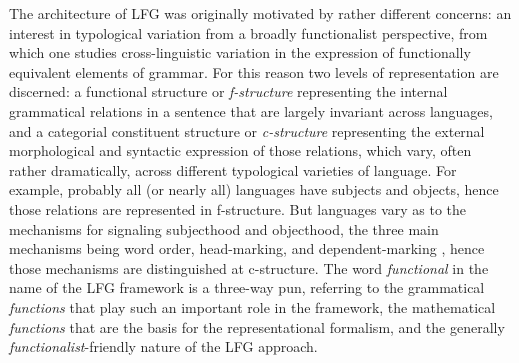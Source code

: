 The architecture of LFG was originally motivated by rather different concerns:  an interest in typological variation from a broadly functionalist perspective, from which one studies cross-linguistic variation in the expression of functionally equivalent elements of grammar.
For this reason two levels of representation are discerned: a functional structure or \textit{f-structure} representing the internal grammatical relations in a sentence that are largely invariant across languages, and a categorial constituent structure or \textit{c-structure} representing the external morphological and syntactic expression of those relations, which vary, often rather dramatically, across different typological varieties of language.  For example, probably all (or nearly all) languages have subjects and objects, hence those relations are represented in f-structure.  But languages vary as to the mechanisms for signaling subjecthood and objecthood,  the three main mechanisms being word order, head-marking, and dependent-marking \citep{Nichols86a-u}, hence those mechanisms are distinguished at c-structure.    The word \textit{functional} in the name of the LFG framework  is a three-way pun, referring to the grammatical \textit{functions} that play such an important role in the framework, the mathematical \textit{functions} that are the basis for the representational formalism, and the generally \textit{functionalist}-friendly nature of the LFG approach.  


